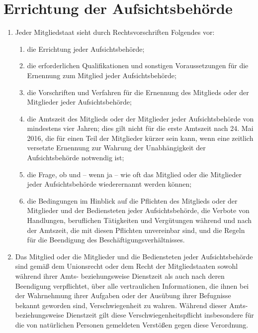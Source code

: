 \chapter{Errichtung der Aufsichtsbehörde}
\label{ch:54}


\begin{enumerate}

  \item Jeder Mitgliedstaat sieht durch Rechtsvorschriften Folgendes vor:
  \label{itm:54-1}

  \begin{enumerate}
  
    \item die Errichtung jeder Aufsichtsbehörde;
    \label{itm:54-1a}

    \item die erforderlichen Qualifikationen und sonstigen Voraussetzungen für die Ernennung zum Mitglied jeder
     Aufsichtsbehörde;
    \label{itm:54-1b}

    \item die Vorschriften und Verfahren für die Ernennung des Mitglieds oder der Mitglieder jeder Aufsichtsbehörde;
    \label{itm:54-1c}

    \item die Amtszeit des Mitglieds oder der Mitglieder jeder Aufsichtsbehörde von mindestens vier Jahren; dies gilt
     nicht für die erste Amtszeit nach 24. Mai 2016, die für einen Teil der Mitglieder kürzer sein kann, wenn eine
     zeitlich versetzte Ernennung zur Wahrung der Unabhängigkeit der Aufsichtsbehörde notwendig ist;
    \label{itm:54-1d}

    \item die Frage, ob und -- wenn ja -- wie oft das Mitglied oder die Mitglieder jeder Aufsichtsbehörde wiederernannt
     werden können;
    \label{itm:54-1e}

    \item die Bedingungen im Hinblick auf die Pflichten des Mitglieds oder der Mitglieder und der Bediensteten jeder
     Aufsichtsbehörde, die Verbote von Handlungen, beruflichen Tätigkeiten und Vergütungen während und nach der
     Amtszeit, die mit diesen Pflichten unvereinbar sind, und die Regeln für die Beendigung des
     Beschäftigungsverhältnisses.
   \label{itm:54-1f}

  \end{enumerate}

  \item Das Mitglied oder die Mitglieder und die Bediensteten jeder Aufsichtsbehörde sind gemäß dem Unionsrecht oder dem
   Recht der Mitgliedstaaten sowohl während ihrer Amts- beziehungsweise Dienstzeit als auch nach deren Beendigung
   verpflichtet, über alle vertraulichen Informationen, die ihnen bei der Wahrnehmung ihrer Aufgaben oder der Ausübung
   ihrer Befugnisse bekannt geworden sind, Verschwiegenheit zu wahren. Während dieser Amts- beziehungsweise Dienstzeit
   gilt diese Verschwiegenheitspflicht insbesondere für die von natürlichen Personen gemeldeten Verstößen gegen diese
   Verordnung.
  \label{itm:54-2}

\end{enumerate}


